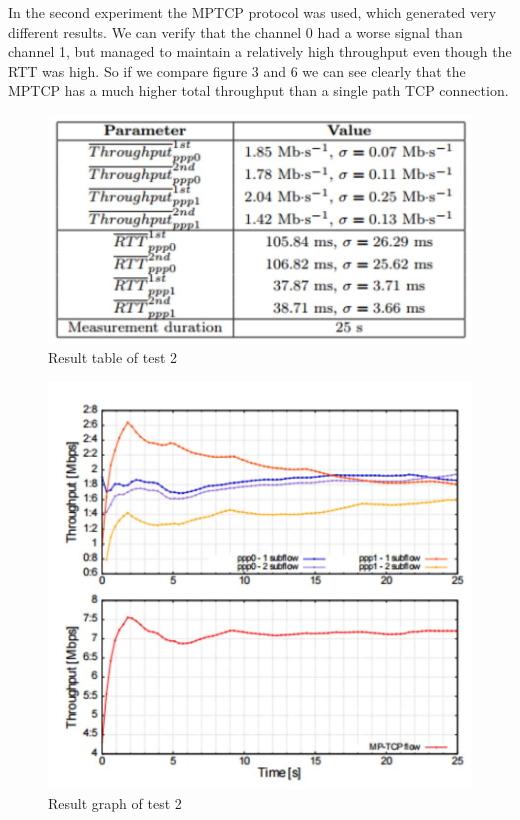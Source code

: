 \documentclass[11pt,twocolumn]{article}
\begin{document}
In the second experiment the MPTCP protocol was used, which generated very different results. We can verify that the channel 0 had a worse signal than channel 1, but managed to maintain a relatively high throughput even though the RTT was high. So if we compare figure 3 and 6 we can see clearly that the MPTCP has a much higher total throughput than a single path TCP connection.

\begin{figure}[ht]
\begin{center}
\includegraphics[scale=0.6]{table_2}
\caption{Result table of test 2}
\end{center}
\end{figure}
\begin{figure}[ht]
\begin{center}
\includegraphics[scale=0.5]{graph_2}
\caption{Result graph of test 2}
\end{center}
\end{figure}
\end{document}
